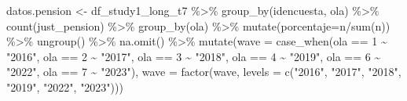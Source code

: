 \documentclass[
  12pt,
  letterpaper,
  DIV=11,
  numbers=noendperiod]{scrartcl}
\newenvironment{Shaded}{\begin{snugshade}}{\end{snugshade}}
\newcommand{\AttributeTok}[1]{\textcolor[rgb]{0.40,0.45,0.13}{#1}}
\newcommand{\DecValTok}[1]{\textcolor[rgb]{0.68,0.00,0.00}{#1}}
\newcommand{\FunctionTok}[1]{\textcolor[rgb]{0.28,0.35,0.67}{#1}}
\newcommand{\NormalTok}[1]{\textcolor[rgb]{0.00,0.23,0.31}{#1}}
\newcommand{\OtherTok}[1]{\textcolor[rgb]{0.00,0.23,0.31}{#1}}
\newcommand{\SpecialCharTok}[1]{\textcolor[rgb]{0.37,0.37,0.37}{#1}}
\newcommand{\StringTok}[1]{\textcolor[rgb]{0.13,0.47,0.30}{#1}}
\begin{document}
\begin{Shaded}
\begin{Highlighting}[]
\NormalTok{datos.pension }\OtherTok{\textless{}{-}}\NormalTok{ df\_study1\_long\_t7 }\SpecialCharTok{\%\textgreater{}\%} 
  \FunctionTok{group\_by}\NormalTok{(idencuesta, ola) }\SpecialCharTok{\%\textgreater{}\%} 
  \FunctionTok{count}\NormalTok{(just\_pension) }\SpecialCharTok{\%\textgreater{}\%} 
  \FunctionTok{group\_by}\NormalTok{(ola) }\SpecialCharTok{\%\textgreater{}\%} 
  \FunctionTok{mutate}\NormalTok{(}\AttributeTok{porcentaje=}\NormalTok{n}\SpecialCharTok{/}\FunctionTok{sum}\NormalTok{(n)) }\SpecialCharTok{\%\textgreater{}\%} 
  \FunctionTok{ungroup}\NormalTok{() }\SpecialCharTok{\%\textgreater{}\%} 
  \FunctionTok{na.omit}\NormalTok{() }\SpecialCharTok{\%\textgreater{}\%} 
  \FunctionTok{mutate}\NormalTok{(}\AttributeTok{wave =} \FunctionTok{case\_when}\NormalTok{(ola }\SpecialCharTok{==} \DecValTok{1} \SpecialCharTok{\textasciitilde{}} \StringTok{"2016"}\NormalTok{,}
\NormalTok{                          ola }\SpecialCharTok{==} \DecValTok{2} \SpecialCharTok{\textasciitilde{}} \StringTok{"2017"}\NormalTok{,}
\NormalTok{                          ola }\SpecialCharTok{==} \DecValTok{3} \SpecialCharTok{\textasciitilde{}} \StringTok{"2018"}\NormalTok{,}
\NormalTok{                          ola }\SpecialCharTok{==} \DecValTok{4} \SpecialCharTok{\textasciitilde{}} \StringTok{"2019"}\NormalTok{,}
\NormalTok{                          ola }\SpecialCharTok{==} \DecValTok{6} \SpecialCharTok{\textasciitilde{}} \StringTok{"2022"}\NormalTok{,}
\NormalTok{                          ola }\SpecialCharTok{==} \DecValTok{7} \SpecialCharTok{\textasciitilde{}} \StringTok{"2023"}\NormalTok{),}
         \AttributeTok{wave =} \FunctionTok{factor}\NormalTok{(wave, }\AttributeTok{levels =} \FunctionTok{c}\NormalTok{(}\StringTok{"2016"}\NormalTok{,}
                                        \StringTok{"2017"}\NormalTok{,}
                                        \StringTok{"2018"}\NormalTok{,}
                                        \StringTok{"2019"}\NormalTok{,}
                                        \StringTok{"2022"}\NormalTok{,}
                                        \StringTok{"2023"}\NormalTok{)))}




\end{Highlighting}
\end{Shaded}
\end{document}
